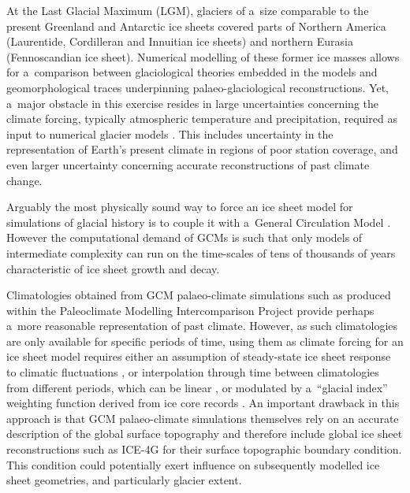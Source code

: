 \documentclass[tc, ms]{copernicus}
\begin{document}
\introduction
\label{sec:intro}

At the Last Glacial Maximum (LGM), glaciers of a~size comparable to the present Greenland and Antarctic ice sheets covered parts of Northern America (Laurentide, Cordilleran and Innuitian ice sheets) and northern Eurasia (Fennoscandian ice sheet). Numerical modelling of these former ice masses allows for a~comparison between glaciological theories embedded in the models and geomorphological traces underpinning palaeo-glaciological reconstructions. Yet, a~major obstacle in this exercise resides in large uncertainties concerning the climate forcing, typically atmospheric temperature and precipitation, required as input to numerical glacier models \citep{hebeler-etal-2008}. This includes uncertainty in the representation of Earth's present climate in regions of poor station coverage, and even larger uncertainty concerning accurate reconstructions of past climate change.

Arguably the most physically sound way to force an ice sheet model for simulations of glacial history is to couple it with a~General Circulation Model \citep[GCM;][]{yoshimori-etal-2001,calov-etal-2002,abeouchi-etal-2007,charbit-etal-2013}. However the computational demand of GCMs is such that only models of intermediate complexity can run on the time-scales of tens of thousands of years characteristic of ice sheet growth and decay.

Climatologies obtained from GCM palaeo-climate simulations such as produced within the Paleoclimate Modelling Intercomparison Project \citep[PMIP;][]{joussaume-taylor-1995} provide perhaps a~more reasonable representation of past climate. However, as such climatologies are only available for specific periods of time, using them as climate forcing for an ice sheet model requires either an assumption of steady-state ice sheet response to climatic fluctuations \citep{huybrechts-tsiobbel-1996}, or interpolation through time between climatologies from different periods, which can be linear \citep{charbit-etal-2002}, or modulated by a~``glacial index'' weighting function derived from ice core  records \citep{marshall-clarke-1999,tarasov-peltier-2004,zweck-huybrechts-2005,gregoire-etal-2012}. An important drawback in this approach is that GCM palaeo-climate simulations themselves rely on an accurate description of the global surface topography and therefore include global ice sheet reconstructions such as ICE-4G \citep{peltier-1994} for their surface topographic boundary condition. This condition could potentially exert influence on subsequently modelled ice sheet geometries, and particularly glacier extent.
\end{document}
